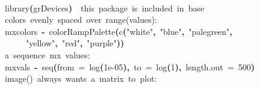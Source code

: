 \documentclass[a4paper]{article}
\newcommand{\hlnumber}[1]{\textcolor[rgb]{0.0823529411764706,0.0784313725490196,0.709803921568627}{#1}}%
\newcommand{\hlfunctioncall}[1]{\textcolor[rgb]{1,0,0}{#1}}%
\newcommand{\hlstring}[1]{\textcolor[rgb]{0.6,0.6,1}{#1}}%
\newcommand{\hlkeyword}[1]{\textcolor[rgb]{0,0,0}{\textbf{#1}}}%
\newcommand{\hlargument}[1]{\textcolor[rgb]{0.694117647058824,0.247058823529412,0.0196078431372549}{#1}}%
\newcommand{\hlcomment}[1]{\textcolor[rgb]{0.8,0.8,0.8}{#1}}%
\newcommand{\hlassignement}[1]{\textcolor[rgb]{0.215686274509804,0.215686274509804,0.384313725490196}{\textbf{#1}}}%
\newcommand{\hlsymbol}[1]{\textcolor[rgb]{0,0,0}{#1}}%
\newcommand{\hlprompt}[1]{\textcolor[rgb]{0,0,0}{#1}}%
\newcommand{\hlstd}[1]{\textcolor[rgb]{0,0,0}{#1}}%
\newenvironment{Houtput}{\raggedright}{%
%
}
\begin{document}
\begin{Houtput}
\hspace*{\fill}\\
\hlstd{}\ttfamily\noindent
\hlprompt{\usebox{\hlnormalsizeboxgreaterthan}{\ }}\hlfunctioncall{library}\hlkeyword{(}\hlsymbol{grDevices}\hlkeyword{)}{\ }{\ }\hlcomment{\usebox{\hlnormalsizeboxhash}{\ }this{\ }package{\ }is{\ }included{\ }in{\ }base}\mbox{}
\normalfont
\hspace*{\fill}\\
\hlstd{}\ttfamily\noindent
\hlprompt{\usebox{\hlnormalsizeboxgreaterthan}{\ }}\hlcomment{\usebox{\hlnormalsizeboxhash}{\ }colors{\ }evenly{\ }spaced{\ }over{\ }range(values):}\mbox{}
\normalfont
\hspace*{\fill}\\
\hlstd{}\ttfamily\noindent
\hlprompt{\usebox{\hlnormalsizeboxgreaterthan}{\ }}\hlsymbol{mxcolors}{\ }\hlassignement{\usebox{\hlnormalsizeboxlessthan}-}{\ }\hlfunctioncall{colorRampPalette}\hlkeyword{(}\hlfunctioncall{c}\hlkeyword{(}\hlstring{"white"}\hlkeyword{,}{\ }\hlstring{"blue"}\hlkeyword{,}{\ }\hlstring{"palegreen"}\hlkeyword{,}\hspace*{\fill}\\
\hlstd{}\hlprompt{{\ }}{\ }{\ }{\ }{\ }\hlstring{"yellow"}\hlkeyword{,}{\ }\hlstring{"red"}\hlkeyword{,}{\ }\hlstring{"purple"}\hlkeyword{)}\hlkeyword{)}\mbox{}
\normalfont
\hspace*{\fill}\\
\hlstd{}\ttfamily\noindent
\hlprompt{\usebox{\hlnormalsizeboxgreaterthan}{\ }}\hlcomment{\usebox{\hlnormalsizeboxhash}{\ }a{\ }sequence{\ }mx{\ }values:}\mbox{}
\normalfont
\hspace*{\fill}\\
\hlstd{}\ttfamily\noindent
\hlprompt{\usebox{\hlnormalsizeboxgreaterthan}{\ }}\hlsymbol{mxvals}{\ }\hlassignement{\usebox{\hlnormalsizeboxlessthan}-}{\ }\hlfunctioncall{seq}\hlkeyword{(}\hlargument{from}{\ }\hlargument{=}{\ }\hlfunctioncall{log}\hlkeyword{(}\hlnumber{1e-05}\hlkeyword{)}\hlkeyword{,}{\ }\hlargument{to}{\ }\hlargument{=}{\ }\hlfunctioncall{log}\hlkeyword{(}\hlnumber{1}\hlkeyword{)}\hlkeyword{,}{\ }\hlargument{length.out}{\ }\hlargument{=}{\ }\hlnumber{500}\hlkeyword{)}\mbox{}
\normalfont
\hspace*{\fill}\\
\hlstd{}\ttfamily\noindent
\hlprompt{\usebox{\hlnormalsizeboxgreaterthan}{\ }}\hlcomment{\usebox{\hlnormalsizeboxhash}{\ }image(){\ }always{\ }wants{\ }a{\ }matrix{\ }to{\ }plot:}\mbox{}

\end{Houtput}
\end{document}
